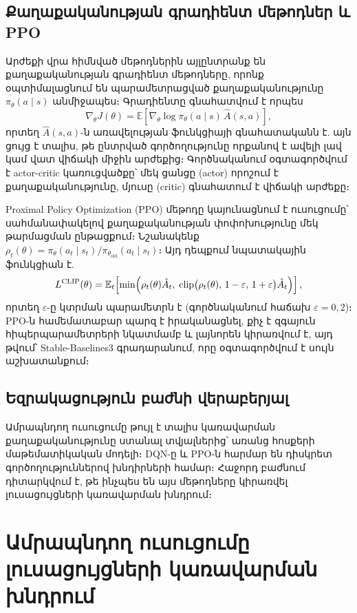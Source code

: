 \documentclass[12pt,a4paper]{extreport}
\begin{document}
\subsection{Քաղաքականության գրադիենտ մեթոդներ և PPO}

Արժեքի վրա հիմնված մեթոդներին այլընտրանք են քաղաքականության գրադիենտ մեթոդները, որոնք օպտիմալացնում են պարամետրացված քաղաքականությունը $\pi_\theta(a \mid s)$ անմիջապես։ Գրադիենտը գնահատվում է որպես
\begin{equation}
  \nabla_\theta J(\theta) = \mathbb{E}\!\left[\nabla_\theta \log \pi_\theta(a \mid s)\, \hat{A}(s,a)\right],
\end{equation}
որտեղ $\hat{A}(s,a)$-ն առավելության ֆունկցիայի գնահատականն է. այն ցույց է տալիս, թե ընտրված գործողությունը որքանով է ավելի լավ կամ վատ վիճակի միջին արժեքից։ Գործնականում օգտագործվում է actor-critic կառուցվածքը՝ մեկ ցանցը (actor) որոշում է քաղաքականությունը, մյուսը (critic) գնահատում է վիճակի արժեքը։

Proximal Policy Optimization (PPO) մեթոդը \cite{schulman2017} կայունացնում է ուսուցումը՝ սահմանափակելով քաղաքականության փոփոխությունը մեկ թարմացման ընթացքում։ Նշանակենք $\rho_t(\theta) = \pi_\theta(a_t \mid s_t)/\pi_{\theta_{\text{old}}}(a_t \mid s_t)$։ Այդ դեպքում նպատակային ֆունկցիան է.
\begin{equation}
  L^{\text{CLIP}}(\theta) = \mathbb{E}_t\!\left[\min\Bigl(\rho_t(\theta)\hat{A}_t,\; \operatorname{clip}\bigl(\rho_t(\theta),\, 1-\varepsilon,\, 1+\varepsilon\bigr)\hat{A}_t\Bigr)\right],
\end{equation}
որտեղ $\varepsilon$-ը կտրման պարամետրն է (գործնականում հաճախ $\varepsilon = 0{,}2$)։ PPO-ն համեմատաբար պարզ է իրականացնել, քիչ է զգայուն հիպերպարամետրերի նկատմամբ և լայնորեն կիրառվում է, այդ թվում՝ Stable-Baselines3 գրադարանում, որը օգտագործվում է սույն աշխատանքում։

\subsection{Եզրակացություն բաժնի վերաբերյալ}

Ամրապնդող ուսուցումը թույլ է տալիս կառավարման քաղաքականությունը ստանալ տվյալներից՝ առանց հոսքերի մաթեմատիկական մոդելի։ DQN-ը և PPO-ն հարմար են դիսկրետ գործողություններով խնդիրների համար։ Հաջորդ բաժնում դիտարկվում է, թե ինչպես են այս մեթոդները կիրառվել լուսացույցների կառավարման խնդրում։

\section{Ամրապնդող ուսուցումը լուսացույցների կառավարման խնդրում}
\end{document}
